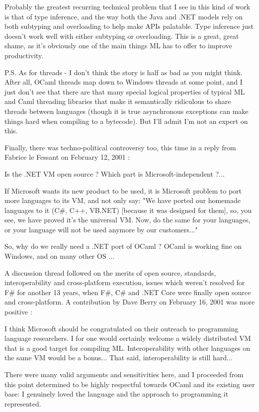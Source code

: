 \documentclass[acmsmall,screen]{acmart}
\begin{document}
\begin{verbquote}
Probably the greatest recurring technical problem that I see in this kind of work is that of type inference, and the way both the Java and .NET models rely on both subtyping and overloading to help make APIs palatable.  Type inference just doesn't work well with either subtyping or overloading.  This is a great, great shame, as it's obviously one of the main things ML has to offer to improve productivity.  

P.S. As for threads - I don't think the story is half as bad as you might think.  After all, OCaml threads map down to Windows threads at some point, and I just don't see that there are that many special logical properties of typical ML and Caml threading libraries that make it semantically ridiculous to share threads between languages (though it is true asynchronous exceptions can make things hard when compiling to a bytecode).  But I'll admit I'm not an expert on this. 
\end{verbquote}
Finally, there was techno-political controversy too, this time in a reply from Fabrice le Fessant on February 12, 2001 \citep{RefCamlArchive5}:
\begin{verbquote}
Is the .NET VM open source ? Which part is Microsoft-independent ?...

If Microsoft wants its new product to be used, it is Microsoft problem to port more languages to its VM, and not only say: "We have ported our homemade languages to it (C\#, C++, VB.NET) [because it was designed for them], so, you see, we have proved it's the universal VM. Now, do the same for your languages, or your language will not be used anymore by our customers..."

So, why do we really need a .NET port of OCaml ? OCaml is working fine on Windows, and on many other OS ... 
\end{verbquote}
A discussion thread followed on the merits of open source, standards, interoperability and cross-platform execution, issues which weren’t resolved for F\# for another 13 years, when F\#, C\# and .NET Core were finally open source and cross-platform.  A contribution by Dave Berry on February 16, 2001 was more positive \citep{RefCamlArchive6}:
\begin{verbquote}
I think Microsoft should be congratulated on their outreach to programming language researchers.  I for one would certainly welcome a widely distributed VM that is a good target for compiling ML.  Interoperability with other languages on the same VM would be a bonus... That said, interoperability is still hard...
\end{verbquote}
There were many valid arguments and sensitivities here, and I proceeded from this point determined to be highly respectful towards OCaml and its existing user base: I genuinely loved the language and the approach to programming it represented. 
\end{document}
